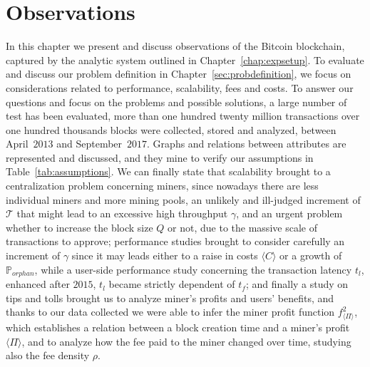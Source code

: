 \documentclass[USenglish]{uit-thesis}
\begin{document}
\chapter{Observations}
\label{chap:evaluation}
In this chapter we present and discuss observations of the
Bitcoin blockchain, captured by the
analytic system outlined in Chapter~\ref{chap:expsetup}. 
To evaluate and discuss our problem definition in Chapter~\ref{sec:probdefinition},
we focus on considerations related to performance,
scalability, fees and costs.
To answer our questions and focus on
the problems and possible solutions,
a large number of test has been evaluated,
more than one hundred twenty million
transactions over one hundred thousands
blocks were collected, stored
and analyzed, between April~$2013$ and September~$2017$.
Graphs and relations between attributes are represented
and discussed, and they mine to
verify our assumptions in Table~\ref{tab:assumptions}.
We can finally state that
scalability brought to a centralization problem concerning miners,
since nowadays there are less individual miners and more mining pools,
an unlikely and ill-judged increment of $\mathcal{T}$
that might lead to an excessive high throughput $\gamma$,
and an urgent problem whether to increase the block size $Q$ or not,
due to the massive scale of transactions to approve;
performance studies brought to consider carefully
an increment of $\gamma$ since it may
leads either to a raise in costs $\langle C \rangle$
or a growth of $\mathbb{P}_{orphan}$, while a user-side
performance study concerning the transaction latency $t_l$,
enhanced after $2015$, $t_l$ became strictly
dependent of $t_f$; and finally a study on
tips and tolls brought us to analyze miner's profits
and users' benefits, and thanks to our data collected
we were able to infer the miner profit function
$f_{\langle \Pi \rangle}^2$, which establishes a relation
between a block creation time and a miner's profit
$\langle \Pi \rangle$, and to analyze how the
fee paid to the miner changed over time, studying
also the fee density $\rho$.


\end{document}

